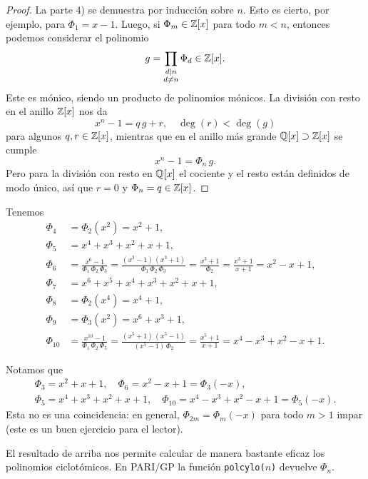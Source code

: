 \begin{proposicion}
\begin{proof}
    La parte 4) se demuestra por inducción sobre $n$. Esto es cierto, por
    ejemplo, para $\Phi_1 = x-1$. Luego, si $\Phi_m \in \mathbb{Z} [x]$ para todo
    $m < n$, entonces podemos considerar el polinomio
    $$g = \prod_{\substack{d\mid n \\ d\ne n}} \Phi_d \in \mathbb{Z} [x].$$
    Este es mónico, siendo un producto de polinomios mónicos. La división con
    resto en el anillo $\mathbb{Z} [x]$ nos da
    $$x^n - 1 = q\,g + r, \quad \deg (r) < \deg (g)$$
    para algunos $q, r \in \mathbb{Z} [x]$, mientras que en el anillo más grande
    $\mathbb{Q} [x] \supset \mathbb{Z} [x]$ se cumple
    $$x^n - 1 = \Phi_n\,g.$$
    Pero para la división con resto en $\mathbb{Q} [x]$ el cociente y el resto están
    definidos de modo único, así que $r = 0$ y $\Phi_n = q \in \mathbb{Z}[x]$.
  \end{proof}
\end{proposicion}

\begin{ejemplo}
  Tenemos
  \begin{align*}
    \Phi_4 & = \Phi_2 (x^2) = x^2 + 1,\\
    \Phi_5 & = x^4 + x^3 + x^2 + x + 1,\\
    \Phi_6 & = \frac{x^6 - 1}{\Phi_1\,\Phi_2\,\Phi_3} = \frac{(x^3-1)\,(x^3+1)}{\Phi_1\,\Phi_2\,\Phi_3} = \frac{x^3+1}{\Phi_2} = \frac{x^3+1}{x+1} = x^2 - x + 1,\\
    \Phi_7 & = x^6 + x^5 + x^4 + x^3 + x^2 + x + 1,\\
    \Phi_8 & = \Phi_2 (x^4) = x^4 + 1,\\
    \Phi_9 & = \Phi_3 (x^2) = x^6 + x^3 + 1,\\
    \Phi_{10} & = \frac{x^{10}-1}{\Phi_1\,\Phi_2\,\Phi_5} = \frac{(x^5+1)\,(x^5-1)}{(x^5-1)\,\Phi_2} = \frac{x^5+1}{x+1} = x^4 - x^3 + x^2 - x + 1.
  \end{align*}

  Notamos que
  \begin{gather*}
    \Phi_3 = x^2 + x + 1, \quad \Phi_6 = x^2 - x + 1 = \Phi_3 (-x),\\
    \Phi_5 = x^4 + x^3 + x^2 + x + 1, \quad \Phi_{10} = x^4 - x^3 + x^2 - x + 1 = \Phi_5 (-x).
  \end{gather*}
  Esta no es una coincidencia: en general, $\Phi_{2m} = \Phi_m (-x)$ para todo
  $m > 1$ impar (este es un buen ejercicio para el lector).
\end{ejemplo}

El resultado de arriba nos permite calcular de manera bastante eficaz los
polinomios ciclotómicos. En PARI/GP la función \texttt{polcylo($n$)} devuelve
$\Phi_n$.

